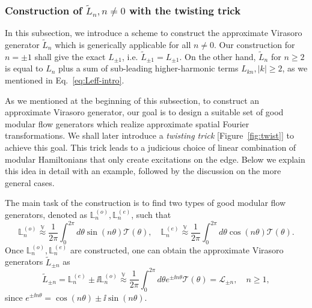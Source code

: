 \documentclass[12pt, nofootinbib]{article}
\theoremstyle{plain}
\theoremstyle{assumption}
\theoremstyle{definition}
\theoremstyle{plain}
\theoremstyle{plain}
\theoremstyle{plain}
\theoremstyle{plain}
\theoremstyle{plain}
\def\vapprox{\stackrel{\mathbb{V}}{\approx}}
\def\Lbe{\mathbb{L}^{(e)}}
\def\Lbo{\mathbb{L}^{(o)}}
\def\Leff{\widetilde{L}}
\def\Lcft{\mathscr{L}}
\def\Tcft{\mathscr{T}}
\begin{document}
\subsubsection{Construction of $\Leff_n,n\neq 0$ with the twisting trick}
\label{subsubsec:Leffn}
In this subsection, we introduce a scheme to construct the approximate Virasoro generator $\Leff_n$ which is generically applicable for all $n\neq 0$. Our construction for $n = \pm 1$ shall give the exact $L_{\pm 1}$, i.e. $ \Leff_{\pm 1}=L_{\pm 1}$. On the other hand, $\Leff_n$ for $n\geq 2$ is equal to $L_{n}$ plus a sum of sub-leading higher-harmonic terms $L_{kn}, |k|\geq 2$, as we mentioned in Eq.~\eqref{eq:Leff-intro}. 

As we mentioned at the beginning of this subsection, to construct an approximate Virasoro generator, our goal is to design a suitable set of good modular flow generators which realize approximate spatial Fourier transformations. We shall later introduce a \emph{twisting trick} [Figure~\ref{fig:twist}] to achieve this goal. This trick leads to a judicious choice of linear combination of modular Hamiltonians that only create excitations on the edge. Below we explain this idea in detail with an example, followed by the discussion on the more general cases.

The main task of the construction is to find two types of good modular flow generators, denoted as $\Lbo_n,\Lbe_n$, such that  
\begin{equation}
    \Lbo_n \vapprox \frac{1}{2\pi}\int_0^{2\pi}d\theta \sin(n\theta)\Tcft(\theta),\quad  \Lbe_n \vapprox \frac{1}{2\pi}\int_0^{2\pi}d\theta \cos(n\theta)\Tcft(\theta).  
\end{equation}
Once $\Lbo_n,\Lbe_n$ are constructed, one can obtain the approximate Virasoro generators $\Leff_{\pm n}$ as
\begin{equation}
    \Leff_{\pm n} = \Lbe_n \pm \ii \Lbo_n \vapprox \frac{1}{2\pi}\int_0^{2\pi}d\theta e^{\pm \ii n\theta} \Tcft(\theta) = \Lcft_{\pm n},\quad n\geq 1, 
\end{equation}
since $e^{\pm \ii n\theta} = \cos(n\theta) \pm \ii \sin(n\theta)$.  
\end{document}
